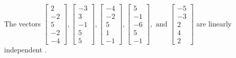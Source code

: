 \begin{exercise}
\begin{exerciseStatement}
  \end{exerciseStatement}
  \begin{exerciseAnswer}
   The vectors \(\left[\begin{array}{r}
2 \\
-2 \\
5 \\
-2 \\
-4
\end{array}\right] , \left[\begin{array}{r}
-3 \\
3 \\
-1 \\
5 \\
5
\end{array}\right] , \left[\begin{array}{r}
-4 \\
-2 \\
5 \\
1 \\
-1
\end{array}\right] , \left[\begin{array}{r}
5 \\
-1 \\
-6 \\
5 \\
-1
\end{array}\right] , \text{ and } \left[\begin{array}{r}
-5 \\
-3 \\
2 \\
4 \\
2
\end{array}\right]\) are 
  	 linearly independent  .
  


  \end{exerciseAnswer}
\end{exercise}